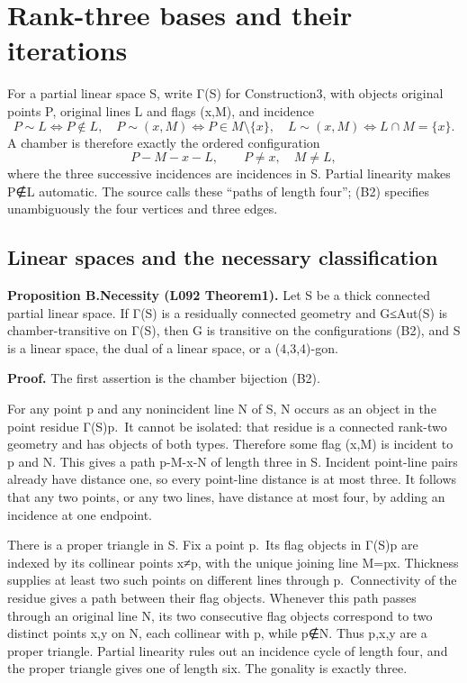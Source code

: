 \section{Rank-three bases and their iterations}
For a partial linear space S, write Γ(S) for Construction3, with objects
original points P, original lines L and flags (x,M), and incidence \[
P\sim L\iff P\notin L,\quad
P\sim(x,M)\iff P\in M\setminus\{x\},\quad
L\sim(x,M)\iff L\cap M=\{x\}.
\tag{B1}
\] A chamber is therefore exactly the ordered configuration \[
P-M-x-L,\qquad P\ne x,\quad M\ne L,
\tag{B2}
\] where the three successive incidences are incidences in S. Partial
linearity makes P∉L automatic. The source calls these ``paths of length
four''; (B2) specifies unambiguously the four vertices and three edges.

\subsection{Linear spaces and the necessary
classification}\label{linear-spaces-and-the-necessary-classification}

\textbf{Proposition B.Necessity (L092 Theorem1).} Let S be a thick
connected partial linear space. If Γ(S) is a residually connected
geometry and G≤Aut(S) is chamber-transitive on Γ(S), then G is
transitive on the configurations (B2), and S is a linear space, the dual
of a linear space, or a (4,3,4)-gon.

\textbf{Proof.} The first assertion is the chamber bijection (B2).

For any point p and any nonincident line N of S, N occurs as an object
in the point residue Γ(S)p.~It cannot be isolated: that residue is a
connected rank-two geometry and has objects of both types. Therefore
some flag (x,M) is incident to p and N. This gives a path p-M-x-N of
length three in S. Incident point-line pairs already have distance one,
so every point-line distance is at most three. It follows that any two
points, or any two lines, have distance at most four, by adding an
incidence at one endpoint.

There is a proper triangle in S. Fix a point p.~Its flag objects in
Γ(S)p are indexed by its collinear points x≠p, with the unique joining
line M=px. Thickness supplies at least two such points on different
lines through p.~Connectivity of the residue gives a path between their
flag objects. Whenever this path passes through an original line N, its
two consecutive flag objects correspond to two distinct points x,y on N,
each collinear with p, while p∉N. Thus p,x,y are a proper triangle.
Partial linearity rules out an incidence cycle of length four, and the
proper triangle gives one of length six. The gonality is exactly three.

